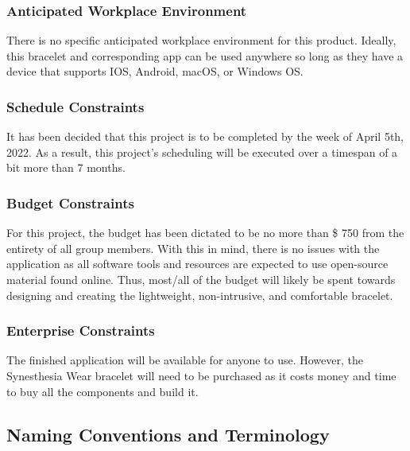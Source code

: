 \documentclass[12pt]{article}
\begin{document}
\subsubsection{Anticipated Workplace Environment}
There is no specific anticipated workplace environment for this product. Ideally, this 
bracelet and corresponding app can be used anywhere so long as they have a device that 
supports IOS, Android, macOS, or Windows OS.

\subsubsection{Schedule Constraints}
It has been decided that this project is to be completed by the week of April 5th, 2022.
As a result, this project's scheduling will be executed over a timespan of a bit more 
than 7 months.

\subsubsection{Budget Constraints}
For this project, the budget has been dictated to be no more than \$ 750 from the entirety 
of all group members. With this in mind, there is no issues with the application as all 
software tools and resources are expected to use open-source material found online. Thus, 
most/all of the budget will likely be spent towards designing and creating the lightweight, 
non-intrusive, and comfortable bracelet.

\subsubsection{Enterprise Constraints}
The finished application will be available for anyone to use. However, the Synesthesia Wear 
bracelet will need to be purchased as it costs money and time to buy all the components and 
build it. 

\subsection{Naming Conventions and Terminology}
\end{document}
